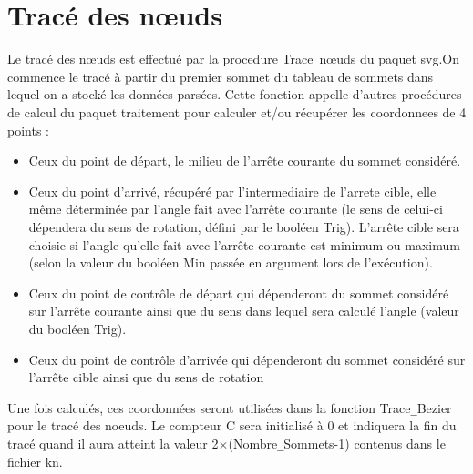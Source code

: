 \documentclass{article}
\begin{document}
\section {Tracé des nœuds}
Le tracé des nœuds est effectué par la procedure Trace\verb+_+nœuds du paquet svg.On commence le tracé à partir du premier sommet du tableau de sommets dans lequel on a stocké les données parsées. Cette fonction appelle d'autres procédures de calcul du paquet traitement pour calculer et/ou récupérer les coordonnees de 4 points :
\begin{itemize}
\item Ceux du point de départ, le milieu de l'arrête courante du sommet considéré.
\item Ceux du point d'arrivé, récupéré par l'intermediaire de l'arrete cible, elle même déterminée par l'angle fait avec l'arrête courante (le sens de celui-ci dépendera du sens de rotation, défini par le booléen Trig). L'arrête cible sera choisie si l'angle qu'elle fait avec l'arrête courante est minimum ou maximum (selon la valeur du booléen Min passée en argument lors de l'exécution).
\item Ceux du point de contrôle de départ qui dépenderont du sommet considéré sur l'arrête courante ainsi que du sens dans lequel sera calculé l'angle (valeur du booléen Trig).
\item Ceux du point de contrôle d'arrivée qui dépenderont du sommet considéré sur l'arrête cible ainsi que du sens de rotation
\end{itemize}
Une fois calculés, ces coordonnées seront utilisées dans la fonction Trace\verb+_+Bezier pour le tracé des noeuds. Le compteur C sera initialisé à 0 et indiquera la fin du tracé quand il aura atteint la valeur 2$\times$(Nombre\verb+_+Sommets-1) contenus dans le fichier kn.
\end{document}
